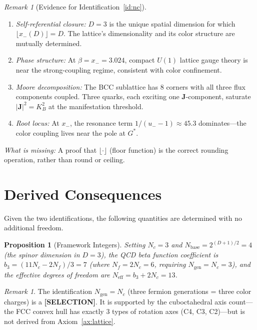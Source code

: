 \documentclass[12pt]{article}
\newtheorem{proposition}[theorem]{Proposition}
\theoremstyle{definition}
\theoremstyle{remark}
\newtheorem{remark}[theorem]{Remark}
\begin{document}
\begin{remark}[Evidence for Identification~\ref{id:nc}]
\mbox{}
\begin{enumerate}[nosep]
    \item \emph{Self-referential closure:} $D = 3$ is the unique spatial dimension for which $\lfloor x_-(D) \rfloor = D$. The lattice's dimensionality and its color structure are mutually determined.
    \item \emph{Phase structure:} At $\beta = x_- = 3.024$, compact $U(1)$ lattice gauge theory is near the strong-coupling regime, consistent with color confinement.
    \item \emph{Moore decomposition:} The BCC sublattice has 8 corners with all three flux components coupled. Three quarks, each exciting one $\mathbf{J}$-component, saturate $|\mathbf{J}|^2 = K_B^2$ at the manifestation threshold.
    \item \emph{Root locus:} At $x_-$, the resonance term $1/(u_- - 1) \approx 45.3$ dominates---the color coupling lives near the pole at $G^*$.
\end{enumerate}
\emph{What is missing:} A proof that $\lfloor \cdot \rfloor$ (floor function) is the correct rounding operation, rather than round or ceiling.
\end{remark}

\section{Derived Consequences}
\label{sec:consequences}

Given the two identifications, the following quantities are determined with no additional freedom.

\begin{proposition}[Framework Integers]
\label{prop:integers}
Setting $N_c = 3$ and $N_{\mathrm{base}} = 2^{(D+1)/2} = 4$ (the spinor dimension in $D = 3$), the QCD beta function coefficient is $b_3 = (11N_c - 2N_f)/3 = 7$ (where $N_f = 2N_c = 6$, requiring $N_{\mathrm{gen}} = N_c = 3$), and the effective degrees of freedom are $N_{\mathrm{eff}} = b_3 + 2N_c = 13$.
\end{proposition}

\begin{remark}
The identification $N_{\mathrm{gen}} = N_c$ (three fermion generations = three color charges) is a \textbf{[SELECTION]}. It is supported by the cuboctahedral axis count---the FCC convex hull has exactly 3 types of rotation axes (C4, C3, C2)---but is not derived from Axiom~\ref{ax:lattice}.
\end{remark}
\end{document}
